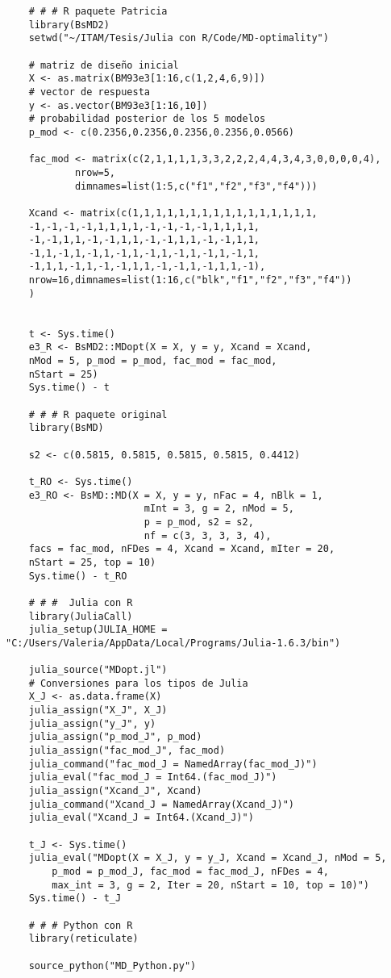 \begin{verbatim}
	# # # R paquete Patricia
	library(BsMD2)
	setwd("~/ITAM/Tesis/Julia con R/Code/MD-optimality")
	
	# matriz de diseño inicial
	X <- as.matrix(BM93e3[1:16,c(1,2,4,6,9)]) 
	# vector de respuesta
	y <- as.vector(BM93e3[1:16,10]) 
	# probabilidad posterior de los 5 modelos
	p_mod <- c(0.2356,0.2356,0.2356,0.2356,0.0566) 
	
	fac_mod <- matrix(c(2,1,1,1,1,3,3,2,2,2,4,4,3,4,3,0,0,0,0,4),
			nrow=5,
			dimnames=list(1:5,c("f1","f2","f3","f4")))
	
	Xcand <- matrix(c(1,1,1,1,1,1,1,1,1,1,1,1,1,1,1,1,
	-1,-1,-1,-1,1,1,1,1,-1,-1,-1,-1,1,1,1,1,
	-1,-1,1,1,-1,-1,1,1,-1,-1,1,1,-1,-1,1,1,
	-1,1,-1,1,-1,1,-1,1,-1,1,-1,1,-1,1,-1,1,
	-1,1,1,-1,1,-1,-1,1,1,-1,-1,1,-1,1,1,-1),
	nrow=16,dimnames=list(1:16,c("blk","f1","f2","f3","f4"))
	)
	
	
	t <- Sys.time()
	e3_R <- BsMD2::MDopt(X = X, y = y, Xcand = Xcand,
	nMod = 5, p_mod = p_mod, fac_mod = fac_mod, 
	nStart = 25)
	Sys.time() - t
	
	# # # R paquete original
	library(BsMD)
	
	s2 <- c(0.5815, 0.5815, 0.5815, 0.5815, 0.4412)
	
	t_RO <- Sys.time()
	e3_RO <- BsMD::MD(X = X, y = y, nFac = 4, nBlk = 1, 
						mInt = 3, g = 2, nMod = 5, 
						p = p_mod, s2 = s2, 
						nf = c(3, 3, 3, 3, 4), 
	facs = fac_mod, nFDes = 4, Xcand = Xcand, mIter = 20, 
	nStart = 25, top = 10)
	Sys.time() - t_RO
	
	# # #  Julia con R
	library(JuliaCall)
	julia_setup(JULIA_HOME = "C:/Users/Valeria/AppData/Local/Programs/Julia-1.6.3/bin")
	
	julia_source("MDopt.jl")
	# Conversiones para los tipos de Julia
	X_J <- as.data.frame(X)
	julia_assign("X_J", X_J)
	julia_assign("y_J", y)
	julia_assign("p_mod_J", p_mod)
	julia_assign("fac_mod_J", fac_mod)
	julia_command("fac_mod_J = NamedArray(fac_mod_J)")
	julia_eval("fac_mod_J = Int64.(fac_mod_J)")
	julia_assign("Xcand_J", Xcand)
	julia_command("Xcand_J = NamedArray(Xcand_J)")
	julia_eval("Xcand_J = Int64.(Xcand_J)")
	
	t_J <- Sys.time()
	julia_eval("MDopt(X = X_J, y = y_J, Xcand = Xcand_J, nMod = 5, 
		p_mod = p_mod_J, fac_mod = fac_mod_J, nFDes = 4, 
		max_int = 3, g = 2, Iter = 20, nStart = 10, top = 10)")
	Sys.time() - t_J
	
	# # # Python con R
	library(reticulate)
	
	source_python("MD_Python.py")
	

\end{verbatim}
